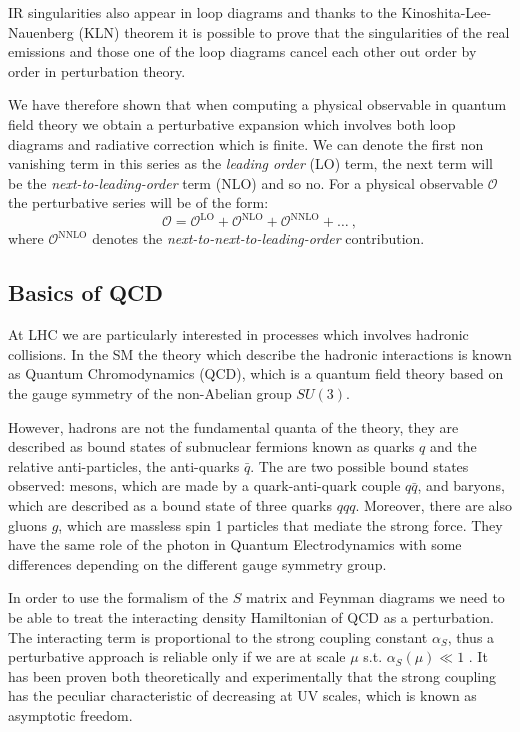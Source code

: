\documentclass[../main/main.tex]{subfiles}
\begin{document}
IR singularities also appear in loop diagrams and thanks to the Kinoshita-Lee-Nauenberg (KLN) theorem it is possible to prove that the singularities of the real emissions and those one of the loop diagrams cancel each other out  order by order in perturbation theory.

We have therefore shown that when computing a physical observable in quantum field theory we obtain a perturbative expansion which 
involves both loop diagrams and radiative correction which is finite. We can denote the first non vanishing term in this series as the 
\emph{leading order} (LO) term, the next term will be the \emph{next-to-leading-order} term (NLO) and so no.
For a physical observable $\mathcal{O}$ the perturbative series will be of the form:
\begin{equation}
	\mathcal{O} = \mathcal{O}^{\text{LO}}+\mathcal{O}^{\text{NLO}}+ \mathcal{O}^{\text{NNLO}} + \dots  \ ,
\end{equation}
	where $ \mathcal{O}^{\text{NNLO}}$ denotes the \emph{next-to-next-to-leading-order }contribution.

\subsection{Basics of QCD}
At LHC we are particularly interested in processes which involves hadronic collisions. In the SM the theory which describe the hadronic interactions is known as Quantum 
Chromodynamics (QCD), which is a quantum field theory based on the gauge symmetry of the non-Abelian group $SU(3)$.

However, hadrons are not the fundamental quanta of the theory, they are described as bound states of subnuclear fermions known as quarks $q$ and the relative anti-particles, the anti-quarks $\bar{q}$. The 
are two possible bound states observed: mesons, which are made by a quark-anti-quark couple $q\bar{q}$, 
and baryons, which are described as a bound state of three quarks $qqq$. Moreover, there are also gluons $g$, which are massless spin 1 particles that mediate the strong force. They have the same role of the photon in Quantum Electrodynamics with some differences depending on the different gauge symmetry group.

In order to use the formalism of the $S$ matrix and Feynman diagrams we need to be able to treat the interacting density Hamiltonian of QCD as 
a perturbation. The interacting term is proportional to the strong coupling constant $\alpha_S$, thus a perturbative approach is reliable only 
if we are at scale $\mu $ s.t. $\alpha_S(\mu)  \ll 1$ . It has been proven both theoretically and experimentally that the strong coupling has the peculiar characteristic of decreasing at UV scales, which is known as asymptotic freedom.
\end{document}
